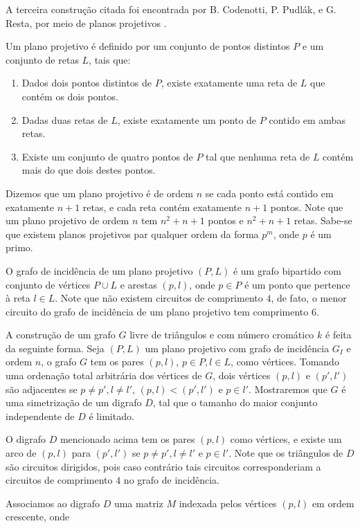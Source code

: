 A terceira construção citada foi encontrada por B. Codenotti, P. Pudlák, e G. Resta, por meio de planos projetivos \cite{codenotti2000some}.

Um plano projetivo é definido por um conjunto de pontos distintos $P$  e um conjunto de retas $L$, tais que:

\begin{enumerate}
\item Dados dois pontos distintos de $P$, existe exatamente uma reta de $L$ que contém os dois pontos. 
\item Dadas duas retas de $L$, existe exatamente um ponto de $P$ contido em ambas retas.
\item Existe um conjunto de quatro pontos de $P$ tal que nenhuma reta de $L$ contém mais do que dois destes pontos.
\end{enumerate}

Dizemos que um plano projetivo é de ordem $n$ se cada ponto está contido em exatamente $n+1$ retas, e cada reta contém exatamente $n+1$ pontos. Note que um plano projetivo de ordem $n$ tem $n^2 + n + 1$ pontos e $n^2 + n + 1$ retas. Sabe-se que existem planos projetivos par qualquer ordem da forma $p^m$, onde $p$ é um primo.

O grafo de incidência de um plano projetivo $(P,L)$ é um grafo bipartido com conjunto de vértices $P \cup L$ e arestas $(p,l)$, onde $p\in P$ é um ponto que pertence à reta $l \in L$. Note que não existem circuitos de comprimento $4$, de fato, o menor circuito do grafo de incidência de um plano projetivo tem comprimento $6$.

A construção de um grafo $G$ livre de triângulos e com número cromático $k$ é feita da seguinte forma. Seja $(P,L)$ um plano projetivo com grafo de incidência $G_I$ e ordem $n$, o grafo $G$ tem os pares $(p,l)$, $p\in P, l\in L$, como vértices. Tomando uma ordenação total arbitrária dos vértices de $G$, dois vértices $(p,l)$ e $(p',l')$ são adjacentes se $p \neq p', l \neq l'$, $(p,l) < (p',l')$ e $p \in l'$. Mostraremos que $G$ é uma simetrização de um digrafo $D$, tal que o tamanho do maior conjunto independente de $D$ é limitado.

O digrafo $D$ mencionado acima tem os pares $(p,l)$ como vértices, e existe um arco de $(p,l)$ para $(p',l')$ se $p \neq p', l \neq l'$ e $p\in l'$. Note que os triângulos de $D$ são circuitos dirigidos, pois caso contrário tais circuitos corresponderiam a circuitos de comprimento $4$ no grafo de incidência.

Associamos ao digrafo $D$ uma matriz $M$ indexada pelos vértices $(p,l)$ em ordem crescente, onde

